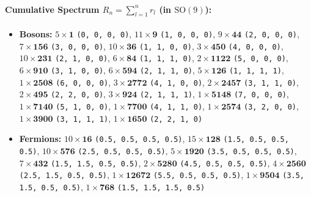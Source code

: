 \documentclass[11pt,a4paper]{article}
\begin{document}
\paragraph{Cumulative Spectrum $R_n = \sum_{l=1}^n r_l$ (in $\mathrm{SO}(9)$):}
\begin{itemize}
    \item \textbf{Bosons:} $5 \times \mathbf{1}$ \texttt{(0, 0, 0, 0)}, $11 \times \mathbf{9}$ \texttt{(1, 0, 0, 0)}, $9 \times \mathbf{44}$ \texttt{(2, 0, 0, 0)}, $7 \times \mathbf{156}$ \texttt{(3, 0, 0, 0)}, $10 \times \mathbf{36}$ \texttt{(1, 1, 0, 0)}, $3 \times \mathbf{450}$ \texttt{(4, 0, 0, 0)}, $10 \times \mathbf{231}$ \texttt{(2, 1, 0, 0)}, $6 \times \mathbf{84}$ \texttt{(1, 1, 1, 0)}, $2 \times \mathbf{1122}$ \texttt{(5, 0, 0, 0)}, $6 \times \mathbf{910}$ \texttt{(3, 1, 0, 0)}, $6 \times \mathbf{594}$ \texttt{(2, 1, 1, 0)}, $5 \times \mathbf{126}$ \texttt{(1, 1, 1, 1)}, $1 \times \mathbf{2508}$ \texttt{(6, 0, 0, 0)}, $3 \times \mathbf{2772}$ \texttt{(4, 1, 0, 0)}, $2 \times \mathbf{2457}$ \texttt{(3, 1, 1, 0)}, $2 \times \mathbf{495}$ \texttt{(2, 2, 0, 0)}, $3 \times \mathbf{924}$ \texttt{(2, 1, 1, 1)}, $1 \times \mathbf{5148}$ \texttt{(7, 0, 0, 0)}, $1 \times \mathbf{7140}$ \texttt{(5, 1, 0, 0)}, $1 \times \mathbf{7700}$ \texttt{(4, 1, 1, 0)}, $1 \times \mathbf{2574}$ \texttt{(3, 2, 0, 0)}, $1 \times \mathbf{3900}$ \texttt{(3, 1, 1, 1)}, $1 \times \mathbf{1650}$ \texttt{(2, 2, 1, 0)}
    \item \textbf{Fermions:} $10 \times \mathbf{16}$ \texttt{(0.5, 0.5, 0.5, 0.5)}, $15 \times \mathbf{128}$ \texttt{(1.5, 0.5, 0.5, 0.5)}, $10 \times \mathbf{576}$ \texttt{(2.5, 0.5, 0.5, 0.5)}, $5 \times \mathbf{1920}$ \texttt{(3.5, 0.5, 0.5, 0.5)}, $7 \times \mathbf{432}$ \texttt{(1.5, 1.5, 0.5, 0.5)}, $2 \times \mathbf{5280}$ \texttt{(4.5, 0.5, 0.5, 0.5)}, $4 \times \mathbf{2560}$ \texttt{(2.5, 1.5, 0.5, 0.5)}, $1 \times \mathbf{12672}$ \texttt{(5.5, 0.5, 0.5, 0.5)}, $1 \times \mathbf{9504}$ \texttt{(3.5, 1.5, 0.5, 0.5)}, $1 \times \mathbf{768}$ \texttt{(1.5, 1.5, 1.5, 0.5)}
\end{itemize}
\end{document}
